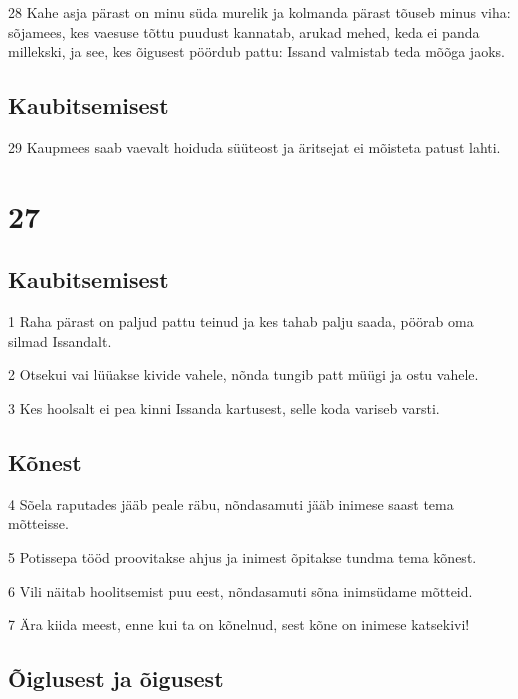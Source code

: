 \par 28 Kahe asja pärast on minu süda murelik ja kolmanda pärast tõuseb minus viha: sõjamees, kes vaesuse tõttu puudust kannatab, arukad mehed, keda ei panda millekski, ja see, kes õigusest pöördub pattu: Issand valmistab teda mõõga jaoks.

\section*{Kaubitsemisest}

\par 29 Kaupmees saab vaevalt hoiduda süüteost ja äritsejat ei mõisteta patust lahti.

\chapter{27}

\section*{Kaubitsemisest}

\par 1 Raha pärast on paljud pattu teinud ja kes tahab palju saada, pöörab oma silmad Issandalt.
\par 2 Otsekui vai lüüakse kivide vahele, nõnda tungib patt müügi ja ostu vahele.
\par 3 Kes hoolsalt ei pea kinni Issanda kartusest, selle koda variseb varsti.

\section*{Kõnest}

\par 4 Sõela raputades jääb peale räbu, nõndasamuti jääb inimese saast tema mõtteisse.
\par 5 Potissepa tööd proovitakse ahjus ja inimest õpitakse tundma tema kõnest.
\par 6 Vili näitab hoolitsemist puu eest, nõndasamuti sõna inimsüdame mõtteid.
\par 7 Ära kiida meest, enne kui ta on kõnelnud, sest kõne on inimese katsekivi!

\section*{Õiglusest ja õigusest}

